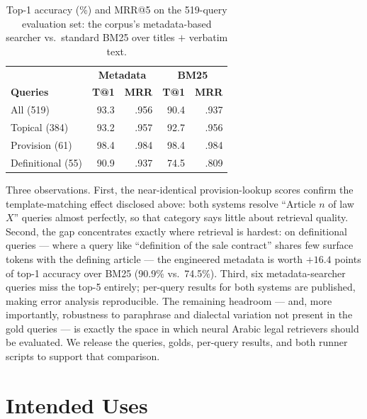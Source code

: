 \documentclass[11pt]{article}
\begin{document}
\begin{table}[t]
\centering
\small
\begin{tabular}{lrrrr}
\toprule
 & \multicolumn{2}{c}{\textbf{Metadata}} & \multicolumn{2}{c}{\textbf{BM25}} \\
\textbf{Queries} & \textbf{T@1} & \textbf{MRR} & \textbf{T@1} & \textbf{MRR} \\
\midrule
All (519) & 93.3 & .956 & 90.4 & .937 \\
Topical (384) & 93.2 & .957 & 92.7 & .956 \\
Provision (61) & 98.4 & .984 & 98.4 & .984 \\
Definitional (55) & 90.9 & .937 & 74.5 & .809 \\
\bottomrule
\end{tabular}
\caption{Top-1 accuracy (\%) and MRR@5 on the 519-query evaluation set:
the corpus's metadata-based searcher vs.\ standard BM25 over titles $+$
verbatim text.}
\label{tab:baseline}
\end{table}

Three observations. First, the near-identical provision-lookup scores
confirm the template-matching effect disclosed above: both systems resolve
``Article $n$ of law $X$'' queries almost perfectly, so that category says
little about retrieval quality. Second, the gap concentrates exactly where
retrieval is hardest: on definitional queries --- where a query like
``definition of the sale contract'' shares few surface tokens with the
defining article --- the engineered metadata is worth $+16.4$ points of
top-1 accuracy over BM25 (90.9\% vs.\ 74.5\%). Third, six metadata-searcher
queries miss the top-5 entirely; per-query results for both systems are
published, making error analysis reproducible. The remaining headroom ---
and, more importantly, robustness to paraphrase and dialectal variation not
present in the gold queries --- is exactly the space in which neural Arabic
legal retrievers should be evaluated. We release the queries, golds,
per-query results, and both runner scripts to support that comparison.

\section{Intended Uses}
\label{sec:uses}
\end{document}
